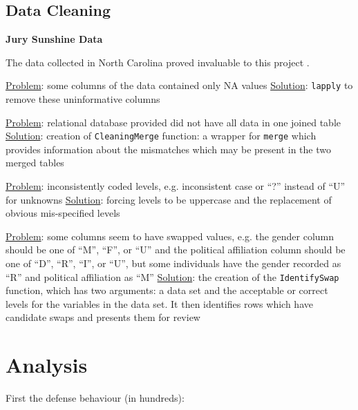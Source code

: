 \documentclass{article}
\begin{document}
\subsection{Data Cleaning} \label{subsec:datacleaning}

\textbf{Jury Sunshine Data}

The data collected in North Carolina proved invaluable to this project \cite{JurySunshineProj}.

\underline{Problem}: some columns of the data contained only NA values
\underline{Solution}: \texttt{lapply} to remove these uninformative columns

\underline{Problem}: relational database provided did not have all data in one joined table
\underline{Solution}: creation of \texttt{CleaningMerge} function: a wrapper for \texttt{merge} which provides information about the
mismatches which may be present in the two merged tables

\underline{Problem}: inconsistently coded levels, e.g. inconsistent case or ``?'' instead of ``U'' for unknowns
\underline{Solution}: forcing levels to be uppercase and the replacement of obvious mis-specified levels

\underline{Problem}: some columns seem to have swapped values, e.g. the gender column should be one of ``M'', ``F'', or ``U'' and the
political affiliation column should be one of ``D'', ``R'', ``I'', or ``U'', but some individuals have the gender recorded as
``R'' and political affiliation as ``M''
\underline{Solution}: the creation of the \texttt{IdentifySwap} function, which has two arguments: a data set and the acceptable or correct
levels for the variables in the data set. It then identifies rows which have candidate swaps and presents them for review

\section{Analysis} \label{sec:analysis}

First the defense behaviour (in hundreds):
\end{document}
